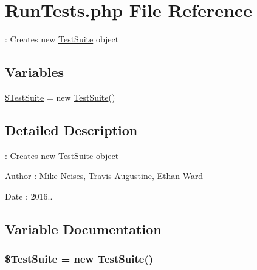 \hypertarget{_run_tests_8php}{}\section{Run\+Tests.\+php File Reference}
\label{_run_tests_8php}


\+: Creates new \hyperlink{class_test_suite}{Test\+Suite} object  


\subsection*{Variables}
\begin{DoxyCompactItemize}
\item 
\hyperlink{_run_tests_8php_aa8680e417afb55aafb492b00e0609595}{\$\+Test\+Suite} = new \hyperlink{class_test_suite}{Test\+Suite}()
\end{DoxyCompactItemize}


\subsection{Detailed Description}
\+: Creates new \hyperlink{class_test_suite}{Test\+Suite} object 

\begin{DoxyAuthor}{Author}
\+: Mike Neises, Travis Augustine, Ethan Ward 
\end{DoxyAuthor}
\begin{DoxyDate}{Date}
\+: 2016.. 
\end{DoxyDate}


\subsection{Variable Documentation}
\subsubsection[{\texorpdfstring{\$\+Test\+Suite}{$TestSuite}}]{\setlength{\rightskip}{0pt plus 5cm}\${\bf Test\+Suite} = new {\bf Test\+Suite}()}\hypertarget{_run_tests_8php_aa8680e417afb55aafb492b00e0609595}{}\label{_run_tests_8php_aa8680e417afb55aafb492b00e0609595}
